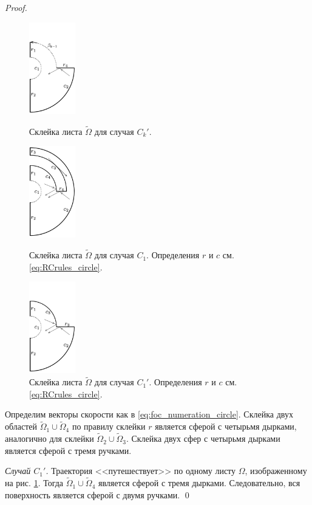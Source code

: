 \begin{proof}
\begin{figure}[!htb]
\centering
\includegraphics[width=2cm]{images/section3_circular/atoms/branching/sect3_Ck_prime_domain.pdf}
    \caption{Склейка листа $\widetilde{\Omega}$ для случая $C_k'$.}
    \label{fig:pt10:_Ck_prime_domain}
    \endminipage\hfill
{}
\centering
\includegraphics[width=2cm]{images/section3_circular/atoms/branching/sect3_C1_domain_2.pdf}
    \caption{Склейка листа $\widetilde{\Omega}$ для случая $C_1$. Определения $r$ и $c$ см. \eqref{eq:RCrules_circle}.}
    \label{fig:pt10:_C1_domain_2}
    \endminipage\hfill
{}
\centering
\includegraphics[width=2cm]{images/section3_circular/atoms/branching/sect3_C1Prime_domain_2.pdf}
    \caption{Склейка листа $\widetilde{\Omega}$ для случая $C_1'$. Определения $r$ и $c$ см. \eqref{eq:RCrules_circle}.}
    \label{fig:pt10:_C1_prime_domain_2}
\endminipage\hfill
\end{figure}


Определим векторы скорости как в \eqref{eq:foc_numeration_circle}. Склейка двух областей $\widetilde{\Omega}_1 \cup \widetilde{\Omega}_4$ по правилу склейки $r$ является сферой с четырьмя дырками, аналогично для склейки $\widetilde{\Omega}_2 \cup \widetilde{\Omega}_3$. Склейка двух сфер с четырьмя дырками является сферой с тремя ручками.

\textit{Случай $C_1'$.} Траектория <<путешествует>> по одному листу $\Omega$, изображенному на рис. \ref{fig:pt10:_C1_prime_domain_2}. Тогда $\widetilde{\Omega}_1 \cup \widetilde{\Omega}_4$ является сферой с тремя дырками. Следовательно, вся поверхность является сферой с двумя ручками.
\qed
\end{proof}

